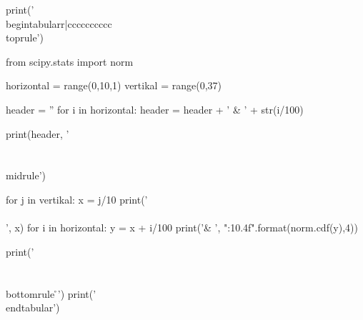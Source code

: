 \documentclass[12pt]{scrartcl}
\begin{document}
\begin{pycode}
print('\\begin{tabular}{r|cccccccccc} \\toprule')

from scipy.stats import norm
 
horizontal = range(0,10,1)
vertikal = range(0,37)
 
header = ''
for i in horizontal:
    header = header + ' & ' + str(i/100)
 
print(header, '\\\\ \\midrule')
 
for j in vertikal:  
    x = j/10
    print('\\\\', x)
    for i in horizontal:
        y = x + i/100
        print('& ', "{:10.4f}".format(norm.cdf(y),4))
 
 
print('\\\\ \\bottomrule \r\n')
print('\\end{tabular}')
\end{pycode}

	
\end{document}
